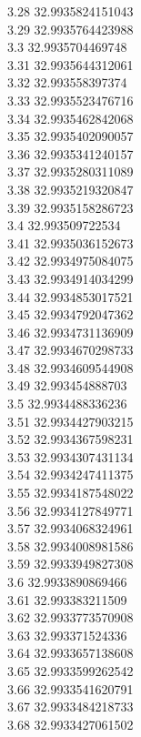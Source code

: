 {3.28	32.9935824151043\\
3.29	32.9935764423988\\
3.3	32.9935704469748\\
3.31	32.9935644312061\\
3.32	32.993558397374\\
3.33	32.9935523476716\\
3.34	32.9935462842068\\
3.35	32.9935402090057\\
3.36	32.9935341240157\\
3.37	32.9935280311089\\
3.38	32.9935219320847\\
3.39	32.9935158286723\\
3.4	32.993509722534\\
3.41	32.9935036152673\\
3.42	32.9934975084075\\
3.43	32.9934914034299\\
3.44	32.9934853017521\\
3.45	32.9934792047362\\
3.46	32.9934731136909\\
3.47	32.9934670298733\\
3.48	32.9934609544908\\
3.49	32.993454888703\\
3.5	32.9934488336236\\
3.51	32.9934427903215\\
3.52	32.9934367598231\\
3.53	32.9934307431134\\
3.54	32.9934247411375\\
3.55	32.9934187548022\\
3.56	32.9934127849771\\
3.57	32.9934068324961\\
3.58	32.9934008981586\\
3.59	32.9933949827308\\
3.6	32.9933890869466\\
3.61	32.993383211509\\
3.62	32.9933773570908\\
3.63	32.993371524336\\
3.64	32.9933657138608\\
3.65	32.9933599262542\\
3.66	32.9933541620791\\
3.67	32.9933484218733\\
3.68	32.9933427061502\\
}
